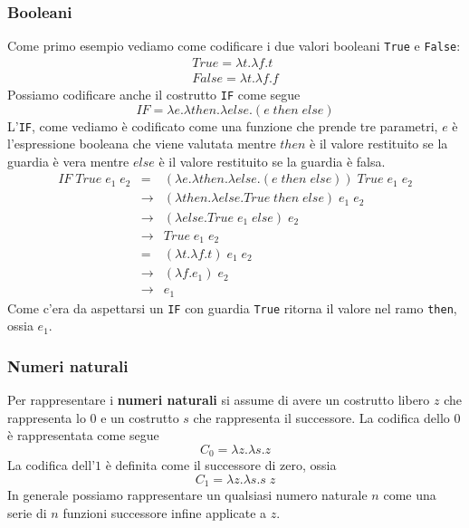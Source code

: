 \subsubsection{Booleani}
Come primo esempio vediamo come codificare i due valori booleani \verb|True| e \verb|False|:
\begin{gather*}
	True = \lambda t.\lambda f.t \\
	False = \lambda t. \lambda f.f
\end{gather*}
Possiamo codificare anche il costrutto \verb|IF| come segue
\[ IF = \lambda e.\lambda then.\lambda else.(e \; then \; else) \]
L'\verb|IF|, come vediamo è codificato come una funzione che prende tre parametri, $e$ è l'espressione booleana
che viene valutata mentre $then$ è il valore restituito se la guardia è vera mentre $else$ è il valore restituito
se la guardia è falsa.
\[
	\begin{array}{rcl}
		IF \; True \; e_1 \; e_2 & =           &
		(\lambda e.\lambda then.\lambda else.(e \; then \; else)) \; True \; e_1 \; e_2                         \\
		                         & \rightarrow & (\lambda then.\lambda else.True \; then \; else) \; e_1 \; e_2 \\
		                         & \rightarrow & (\lambda else.True \; e_1 \; else) \; e_2                      \\
		                         & \rightarrow & True \; e_1 \; e_2                                             \\
		                         & =           & (\lambda t.\lambda f.t) \; e_1 \; e_2                          \\
		                         & \rightarrow & (\lambda f.e_1) \; e_2                                         \\
		                         & \rightarrow & e_1
	\end{array}
\]
Come c'era da aspettarsi un \verb|IF| con guardia \verb|True| ritorna il valore nel ramo \verb|then|, ossia $e_1$.

\subsubsection{Numeri naturali}
Per rappresentare i \textbf{numeri naturali} si assume di avere un costrutto libero $z$ che rappresenta lo $0$ e un
costrutto $s$ che rappresenta il successore. La codifica dello $0$ è rappresentata come segue
\[ C_0 = \lambda z.\lambda s.z \]
La codifica dell'$1$ è definita come il successore di zero, ossia
\[ C_1 = \lambda z.\lambda s.s \; z \]
In generale possiamo rappresentare un qualsiasi numero naturale $n$ come una serie di $n$ funzioni successore infine
applicate a $z$.

